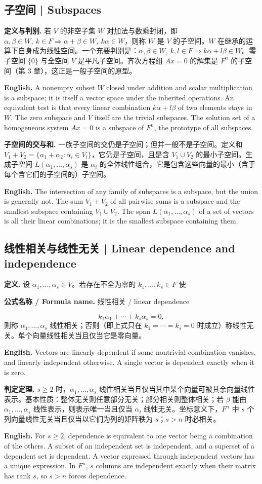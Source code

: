 \documentclass[UTF8,11pt,a4paper]{ctexart}
\newcommand{\EN}[1]{\par\noindent\textbf{English.} #1\par}
\newcommand{\FORMULA}[2]{\par\noindent\textbf{公式名称 / Formula name.} #1 / #2\par}
\begin{document}
\subsection{子空间 | Subspaces}
\noindent\textbf{定义与判别.} 若 $V$ 的非空子集 $W$ 对加法与数乘封闭，即 $\alpha,\beta\in W,\ k\in F\Rightarrow \alpha+\beta\in W,\ k\alpha\in W$，则称 $W$ 是 $V$ 的子空间。$W$ 在继承的运算下自身成为线性空间。一个充要判别是：$\alpha,\beta\in W,\ k,l\in F\Rightarrow k\alpha+l\beta\in W$。零子空间 $\{0\}$ 与全空间 $V$ 是平凡子空间。齐次方程组 $Ax=0$ 的解集是 $F^n$ 的子空间（第 3 章），这正是一般子空间的原型。
\EN{A nonempty subset $W$ closed under addition and scalar multiplication is a subspace; it is itself a vector space under the inherited operations. An equivalent test is that every linear combination $k\alpha+l\beta$ of two elements stays in $W$. The zero subspace and $V$ itself are the trivial subspaces. The solution set of a homogeneous system $Ax=0$ is a subspace of $F^n$, the prototype of all subspaces.}
\noindent\textbf{子空间的交与和.} 一族子空间的交仍是子空间；但并一般不是子空间。定义和 $V_1+V_2=\{\alpha_1+\alpha_2:\alpha_i\in V_i\}$，它仍是子空间，且是含 $V_1\cup V_2$ 的最小子空间。生成子空间 $L(\alpha_1,\dots,\alpha_s)$ 是 $\alpha_i$ 的全体线性组合，它是包含这些向量的最小（含于每个含它们的子空间的）子空间。
\EN{The intersection of any family of subspaces is a subspace, but the union is generally not. The sum $V_1+V_2$ of all pairwise sums is a subspace and the smallest subspace containing $V_1\cup V_2$. The span $L(\alpha_1,\dots,\alpha_s)$ of a set of vectors is all their linear combinations; it is the smallest subspace containing them.}

\subsection{线性相关与线性无关 | Linear dependence and independence}
\noindent\textbf{定义.} 设 $\alpha_1,\dots,\alpha_s\in V$。若存在不全为零的 $k_1,\dots,k_s\in F$ 使
\FORMULA{线性相关}{linear dependence}
\[
k_1\alpha_1+\cdots+k_s\alpha_s=0,
\]
则称 $\alpha_1,\dots,\alpha_s$ 线性相关；否则（即上式只在 $k_1=\cdots=k_s=0$ 时成立）称线性无关。单个向量线性相关当且仅当它是零向量。
\EN{Vectors are linearly dependent if some nontrivial combination vanishes, and linearly independent otherwise. A single vector is dependent exactly when it is zero.}
\noindent\textbf{判定定理.} $s\ge2$ 时，$\alpha_1,\dots,\alpha_s$ 线性相关当且仅当其中某个向量可被其余向量线性表示。基本性质：整体无关则任意部分无关；部分相关则整体相关；若 $\beta$ 能由 $\alpha_1,\dots,\alpha_s$ 线性表示，则表示唯一当且仅当 $\alpha_i$ 线性无关。坐标意义下，$F^n$ 中 $s$ 个列向量线性无关当且仅当以它们为列的矩阵秩为 $s$；$s>n$ 时必相关。
\EN{For $s\ge2$, dependence is equivalent to one vector being a combination of the others. A subset of an independent set is independent, and a superset of a dependent set is dependent. A vector expressed through independent vectors has a unique expression. In $F^n$, $s$ columns are independent exactly when their matrix has rank $s$, so $s>n$ forces dependence.}
\end{document}
